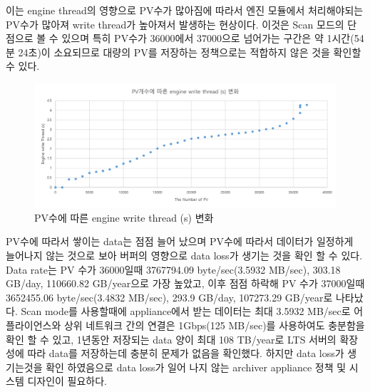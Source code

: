 \documentclass[11pt
  , a4paper
  , article
  , oneside
]{memoir}
\begin{document}
	이는  engine thread의 영향으로 PV수가 많아짐에 따라서 엔진 모듈에서 처리해야되는 PV수가 많아져 write thread가 높아져서 발생하는 현상이다. 이것은 Scan 모드의 단점으로 볼 수 있으며 특히 PV수가 36000에서 37000으로 넘어가는 구간은 약 1시간(54분 24초)이 소요되므로 대량의 PV를 저장하는 정책으로는 적합하지 않은 것을 확인할 수 있다. 
	\clearpage
	\begin{figure}[h!]
		\centering
		\includegraphics[width=1\textwidth, height=0.25\textheight]{./images/thread.png}
		\caption{PV수에 따른 engine write thread (s) 변화}
	\end{figure}

PV수에 따라서 쌓이는 data는 점점 늘어 났으며 PV수에 따라서 데이터가 일정하게 늘어나지 않는 것으로 보아 버퍼의 영향으로 data loss가 생기는 것을 확인 할 수 있다. Data rate는 PV 수가 36000일때 3767794.09 byte/sec(3.5932 MB/sec), 303.18 GB/day, 110660.82 GB/year으로 가장 높았고, 이후 점점 하락해 PV 수가 37000일때 3652455.06 byte/sec(3.4832 MB/sec), 293.9 GB/day, 107273.29 GB/year로 나타났다. Scan mode를 사용할때에 appliance에서 받는 데이터는 최대 3.5932 MB/sec로 어플라이언스와 상위 네트워크 간의 연결은 1Gbps(125 MB/sec)를 사용하여도 충분함을 확인 할 수 있고, 1년동안 저장되는 data 양이 최대 108 TB/year로 LTS 서버의 확장성에 따라 data를 저장하는데 충분히 문제가 없음을 확인했다. 하지만 data loss가 생기는것을 확인 하였음으로 data loss가 일어 나지 않는 archiver appliance 정책 및 시스템 디자인이 필요하다.
	
\end{document}
